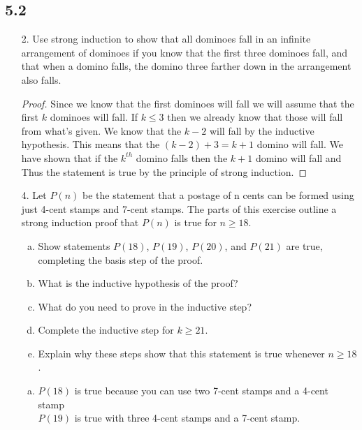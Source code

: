 \subsection{5.2}
\begin{itemize}
    \item[2.]  Use strong induction to show that all dominoes fall in an infinite arrangement of dominoes if you know that the
          first three dominoes fall, and that when a domino falls,
          the domino three farther down in the arrangement also
          falls. \\
          \answer
          \begin{proof}
              Since we know that the first dominoes will fall we will assume that the
              first $k$ dominoes will fall. If $k \leq 3$ then we already know that those
              will fall from what's given. We know that the $k - 2$ will fall by the inductive
              hypothesis. This means that the $(k -2) + 3 = k+1$ domino will fall. We have
              shown that if the $k^{th}$ domino falls then the $k +1$ domino will fall and Thus
              the statement is true by the principle of strong induction.
          \end{proof}
    \item[4.] Let $P(n)$ be the statement that a postage of n cents can be
          formed using just 4-cent stamps and 7-cent stamps. The
          parts of this exercise outline a strong induction proof that
          $P(n)$ is true for $n \geq  18$.
          \begin{enumerate}[a.]
              \item Show statements $P(18)$, $P(19)$, $P(20)$, and $P(21)$ are true, completing the basis step of the proof.
              \item What is the inductive hypothesis of the proof?
              \item What do you need to prove in the inductive step?
              \item Complete the inductive step for $k \geq 21$.
              \item Explain why these steps show that this statement is true whenever $n \geq 18$.
          \end{enumerate}
          \answer
          \begin{enumerate}[a.]
              \item $P(18)$ is true because you can use two 7-cent stamps and a 4-cent stamp\\
                    $P(19)$ is true with three 4-cent stamps and a 7-cent stamp.\\

\end{enumerate}
\end{itemize}
